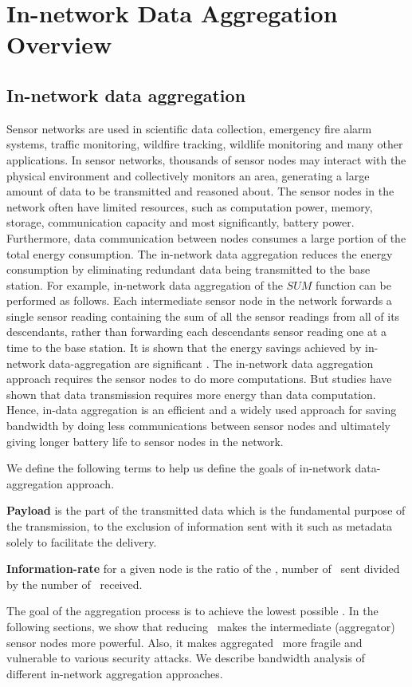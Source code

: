 \chapter{In-network Data Aggregation Overview} %
\label{cha:In-network Data-Aggregation Overview}

\section{In-network data aggregation}
	Sensor networks are used in scientific data collection, emergency fire alarm systems, traffic monitoring, wildfire tracking, wildlife monitoring and many other applications.
	In sensor networks, thousands of sensor nodes may interact with the physical environment and collectively monitors an area, generating a large amount of data to be transmitted and reasoned about.
	The sensor nodes in the network often have limited resources, such as computation power, memory, storage, communication capacity and most significantly, battery power.
	Furthermore, data communication between nodes consumes a large portion of the total energy consumption. 
	The in-network data aggregation reduces the energy consumption by eliminating redundant data being transmitted to the base station.
	For example, in-network data aggregation of the $\textit{SUM}$ function can be performed as follows. 
	Each intermediate sensor node in the network forwards a single sensor reading containing the sum of all the sensor readings from all of its descendants, rather than forwarding each descendants sensor reading one at a time to the base station.
	It is shown that the energy savings achieved by in-network data-aggregation are significant \cite{madden2002tag}.
	The in-network data aggregation approach requires the sensor nodes to do more computations.
	But studies have shown that data transmission requires more energy than data computation. 
	Hence, in-data aggregation is an efficient and a widely used approach for saving bandwidth by doing less communications between sensor nodes and ultimately giving longer battery life to sensor nodes in the network.

	We define the following terms to help us define the goals of in-network data-aggregation approach.
	\begin{definition}\label{def:payload}\cite{PayloadWiKi}
		\textbf{Payload} is the part of the transmitted data which is the fundamental purpose of the transmission, to the exclusion of information sent with it such as metadata solely to facilitate the delivery.
	\end{definition}
	\begin{definition}\label{def:information-rate}
		\textbf{Information-rate} for a given node is the ratio of the \payloads, number of \payloads\ sent divided by the number of \payloads\ received.
	\end{definition}
	The goal of the aggregation process is to achieve the lowest possible \informationRate.
	In the following sections, we show that reducing \informationRate\ makes the intermediate (aggregator) sensor nodes more powerful.
	Also, it makes aggregated \payload\ more fragile and vulnerable to various security attacks.
	We describe bandwidth analysis of different in-network aggregation approaches.

